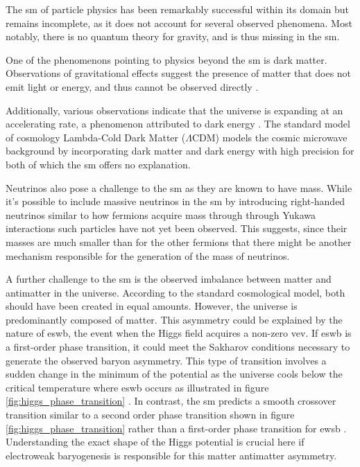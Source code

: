 The \ac{sm} of particle physics has been remarkably successful within its domain but remains incomplete, as it does not account for several observed phenomena. Most notably, there is no quantum theory for gravity, and is thus missing in the \ac{sm}.

One of the phenomenons pointing to physics beyond the \ac{sm} is dark matter. Observations of gravitational effects suggest the presence of matter that does not emit light or energy, and thus cannot be observed directly \citep{dark_matter_a_primer}.

Additionally, various observations indicate that the universe is expanding at an accelerating rate, a phenomenon attributed to dark energy \citep{RevModPhys.75.559}. The standard model of cosmology Lambda-Cold Dark Matter ($\Lambda$CDM) \citep{planck2020} models the cosmic microwave background by incorporating dark matter and dark energy with high precision for both of which the \ac{sm} offers no explanation.

Neutrinos also pose a challenge to the \ac{sm} as they are known to have mass. While it's possible to include massive neutrinos in the \ac{sm} by introducing right-handed neutrinos similar to how fermions acquire mass through through Yukawa interactions such particles have not yet been observed. This suggests, since their masses are much smaller than for the other fermions that there might be another mechanism responsible for the generation of the mass of neutrinos.

A further challenge to the \ac{sm} is the observed imbalance between matter and antimatter in the universe. According to the standard cosmological model, both should have been created in equal amounts. However, the universe is predominantly composed of matter. This asymmetry could be explained by the nature of \acf{eswb}, the event when the Higgs field acquires a non-zero \ac{vev}. If \ac{eswb} is a first-order phase transition, it could meet the Sakharov conditions necessary to generate the observed baryon asymmetry. This type of transition involves a sudden change in the minimum of the potential as the universe cools below the critical temperature where \ac{eswb} occurs as illustrated in figure \ref{fig:higgs_phase_transition} \citep{Banerjee2011ElectroweakPT,MICCO2020100045}. In contrast, the \ac{sm} predicts a smooth crossover transition similar to a second order phase transition shown in figure \ref{fig:higgs_phase_transition} rather than a first-order phase transition for \ac{ewsb} \citep{Morrissey_2012}. Understanding the exact shape of the Higgs potential is crucial here if electroweak baryogenesis is responsible for this matter antimatter asymmetry.


